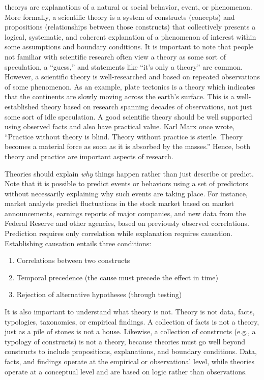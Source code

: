 \Glspl{theory} are explanations of a natural or social behavior, event, or phenomenon. More formally, a scientific theory is a system of constructs (concepts) and propositions (relationships between those constructs) that collectively presents a logical, systematic, and coherent explanation of a phenomenon of interest within some assumptions and boundary conditions\cite{bacharach1989organizational}. It is important to note that people not familiar with scientific research often view a theory as some sort of speculation, a ``guess,'' and statements like ``it's only a theory'' are common. However, a scientific theory is well-researched and based on repeated observations of some phenomenon. As an example, plate tectonics is a theory which indicates that the continents are slowly moving across the earth's surface. This is a well-established theory based on research spanning decades of observations, not just some sort of idle speculation. A good scientific theory should be well supported using observed facts and also have practical value. Karl Marx once wrote, ``Practice without theory is blind. Theory without practice is sterile. Theory becomes a material force as soon as it is absorbed by the masses.''\cite{marx1971contribution} Hence, both theory and practice are important aspects of research.

Theories should explain \textit{why} things happen rather than just describe or predict. Note that it is possible to predict events or behaviors using a set of predictors without necessarily explaining why such events are taking place. For instance, market analysts predict fluctuations in the stock market based on market announcements, earnings reports of major companies, and new data from the Federal Reserve and other agencies, based on previously observed correlations. Prediction requires only correlation while explanation requires causation. Establishing causation entails three conditions: 

\begin{enumerate}
	\item Correlations between two constructs
	\item Temporal precedence (the cause must precede the effect in time)
	\item Rejection of alternative hypotheses (through testing)
\end{enumerate}

It is also important to understand what theory is not. Theory is not data, facts, typologies, taxonomies, or empirical findings. A collection of facts is not a theory, just as a pile of stones is not a house. Likewise, a collection of constructs (e.g., a typology of constructs) is not a theory, because theories must go well beyond constructs to include propositions, explanations, and boundary conditions. Data, facts, and findings operate at the empirical or observational level, while theories operate at a conceptual level and are based on logic rather than observations.

